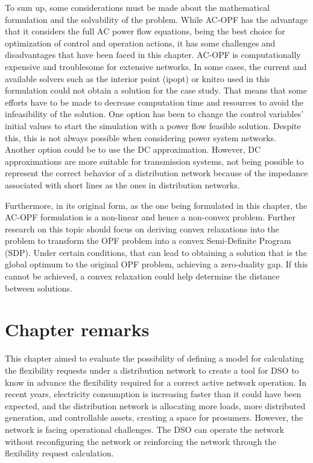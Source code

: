 To sum up, some considerations must be made about the mathematical formulation and the solvability of the problem. While AC-OPF has the advantage that it considers the full AC power flow equations, being the best choice for optimization of control and operation actions, it has some challenges and disadvantages that have been faced in this chapter. AC-OPF is computationally expensive and troublesome for extensive networks. In some cases, the current and available solvers such as the interior point (ipopt) or knitro used in this formulation could not obtain a solution for the case study. That means that some efforts have to be made to decrease computation time and resources to avoid the infeasibility of the solution. One option has been to change the control variables' initial values to start the simulation with a power flow feasible solution. Despite this, this is not always possible when considering power system networks. Another option could be to use the DC approximation. However, DC approximations are more suitable for transmission systems, not being possible to represent the correct behavior of a distribution network because of the impedance associated with short lines as the ones in distribution networks. 

Furthermore, in its original form, as the one being formulated in this chapter, the AC-OPF formulation is a non-linear and hence a non-convex problem. Further research on this topic should focus on deriving convex relaxations into the problem to transform the OPF problem into a convex Semi-Definite Program (SDP). Under certain conditions, that can lead to obtaining a solution that is the global optimum to the original OPF problem, achieving a zero-duality gap. If this cannot be achieved, a convex relaxation could help determine the distance between solutions.  

\section{Chapter remarks}
This chapter aimed to evaluate the possibility of defining a model for calculating the flexibility requests under a distribution network to create a tool for DSO to know in advance the flexibility required for a correct active network operation. In recent years, electricity consumption is increasing faster than it could have been expected, and the distribution network is allocating more loads, more distributed generation, and controllable assets, creating a space for prosumers. However, the network is facing operational challenges. The DSO can operate the network without reconfiguring the network or reinforcing the network through the flexibility request calculation.

